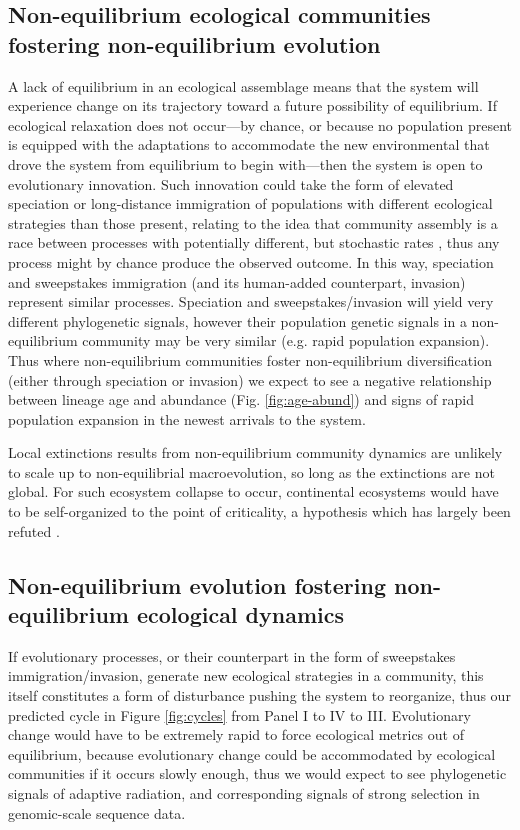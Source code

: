 \documentclass[12pt]{article}
\begin{document}
\subsection{Non-equilibrium ecological communities fostering non-equilibrium evolution}

A lack of equilibrium in an ecological assemblage means that the
system will experience change on its trajectory toward a future
possibility of equilibrium. If ecological relaxation does not
occur---by chance, or because no population present is equipped with
the adaptations to accommodate the new environmental that drove the
system from equilibrium to begin with---then the system is open to
evolutionary innovation.  Such innovation could take the form of
elevated speciation or long-distance immigration of populations with
different ecological strategies than those present, relating to the
idea that community assembly is a race between processes with
potentially different, but stochastic rates \citep{Vanoverbeke2015-ym},
thus any process might by chance produce the observed outcome. In this
way, speciation and sweepstakes immigration (and its human-added
counterpart, invasion) represent similar processes. Speciation and
sweepstakes/invasion will yield very different phylogenetic signals,
however their population genetic signals in a non-equilibrium
community may be very similar (e.g. rapid population expansion). Thus
where non-equilibrium communities foster non-equilibrium
diversification (either through speciation or invasion) we expect to
see a negative relationship between lineage age and abundance (Fig.
\ref{fig:age-abund}) and signs of rapid population expansion in the
newest arrivals to the system.

Local extinctions results from non-equilibrium community dynamics are
unlikely to scale up to non-equilibrial macroevolution, so long as the
extinctions are not global. For such ecosystem collapse to occur,
continental ecosystems would have to be self-organized to the point of
criticality, a hypothesis which has largely been refuted
\citep{Kirchner1998-uk}.

\subsection{Non-equilibrium evolution fostering non-equilibrium ecological dynamics}

If evolutionary processes, or their counterpart in the form of
sweepstakes immigration/invasion, generate new ecological strategies
in a community, this itself constitutes a form of disturbance pushing
the system to reorganize, thus our predicted cycle in Figure
\ref{fig:cycles} from Panel I to IV to III.  Evolutionary change would
have to be extremely rapid to force ecological metrics out of
equilibrium, because evolutionary change could be accommodated by
ecological communities if it occurs slowly enough, thus we would
expect to see phylogenetic signals of adaptive radiation, and
corresponding signals of strong selection in genomic-scale sequence
data.
\end{document}
